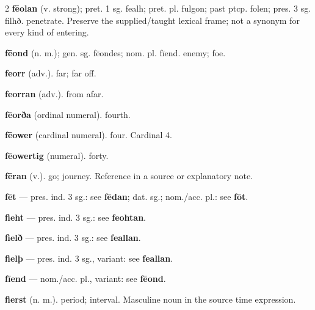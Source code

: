 \begin{multicols*}{2}
\textbf{fēolan} (v. strong); pret. 1 sg. fealh; pret. pl. fulgon; past ptcp. folen; pres. 3 sg. filhð. penetrate. Preserve the supplied/taught lexical frame; not a synonym for every kind of entering.\par
\textbf{fēond} (n. m.); gen. sg. fēondes; nom. pl. fīend. enemy; foe.\par
\textbf{feorr} (adv.). far; far off.\par
\textbf{feorran} (adv.). from afar.\par
\textbf{fēorða} (ordinal numeral). fourth.\par
\textbf{fēower} (cardinal numeral). four. Cardinal 4.\par
\textbf{fēowertig} (numeral). forty.\par
\textbf{fēran} (v.). go; journey. Reference in a source or explanatory note.\par
\textbf{fēt} — pres. ind. 3 sg.: see \textbf{fēdan}; dat. sg.; nom./acc. pl.: see \textbf{fōt}.\par
\textbf{fieht} — pres. ind. 3 sg.: see \textbf{feohtan}.\par
\textbf{fielð} — pres. ind. 3 sg.: see \textbf{feallan}.\par
\textbf{fielþ} — pres. ind. 3 sg., variant: see \textbf{feallan}.\par
\textbf{fīend} — nom./acc. pl., variant: see \textbf{fēond}.\par
\textbf{fierst} (n. m.). period; interval. Masculine noun in the source time expression.\par

\end{multicols*}
